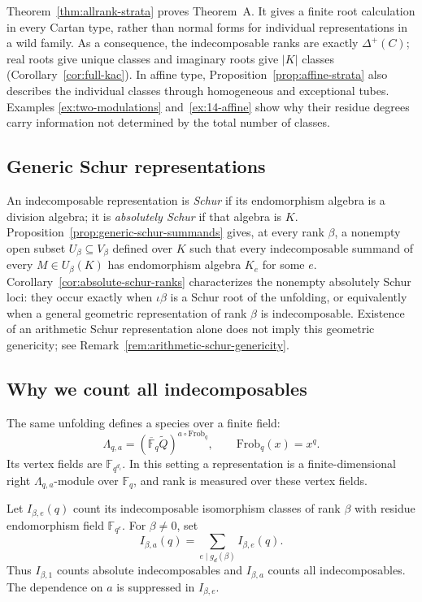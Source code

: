 \documentclass[11pt, reqno]{amsart}
\numberwithin{equation}{section}
\theoremstyle{definition}
\theoremstyle{remark}
\newcommand{\mr}[1]{\mathrm{#1}}
\newcommand{\mb}[1]{\mathbb{#1}}
\newcommand{\Qbar}{\widetilde Q}
\begin{document}
Theorem~\ref{thm:allrank-strata} proves Theorem~A. It gives a finite
root calculation in every Cartan type, rather than normal forms for
individual representations in a wild family. As a consequence, the
indecomposable ranks are exactly $\Delta^+(C)$; real roots give unique
classes and imaginary roots give $|K|$ classes
(Corollary~\ref{cor:full-kac}). In affine type,
Proposition~\ref{prop:affine-strata} also describes the individual
classes through homogeneous and exceptional tubes. Examples
\ref{ex:two-modulations} and~\ref{ex:14-affine} show why their residue
degrees carry information not determined by the total number of classes.


\subsection*{Generic Schur representations}
An indecomposable representation is \emph{Schur} if its endomorphism
algebra is a division algebra; it is \emph{absolutely Schur} if that
algebra is $K$. Proposition~\ref{prop:generic-schur-summands} gives,
at every rank $\beta$, a nonempty open subset $U_\beta\subseteq V_\beta$
defined over $K$ such that every indecomposable summand of every
$M\in U_\beta(K)$ has endomorphism algebra $K_e$ for some $e$.
Corollary~\ref{cor:absolute-schur-ranks} characterizes the nonempty
absolutely Schur loci: they occur exactly when $\iota\beta$ is a
Schur root of the unfolding, or equivalently when a general geometric
representation of rank $\beta$ is indecomposable. Existence of an
arithmetic Schur representation alone does not imply this geometric
genericity; see Remark~\ref{rem:arithmetic-schur-genericity}.


\subsection*{Why we count all indecomposables}
The same unfolding defines a species over a finite field:
\[ \Lambda_{q,a}=(\overline{\mb F}_q\Qbar)^{a\circ\mr{Frob}_q},\qquad \mr{Frob}_q(x)=x^q. \]
Its vertex fields are $\mb F_{q^{d_i}}$. In this setting a
representation is a finite-dimensional right $\Lambda_{q,a}$-module
over $\mb F_q$, and rank is measured over these vertex fields.

Let $I_{\beta,e}(q)$ count its indecomposable isomorphism classes of
rank $\beta$ with residue endomorphism field $\mb F_{q^e}$. For
$\beta\ne0$, set
\[ I_{\beta,a}(q)=\sum_{e\mid g_d(\beta)}I_{\beta,e}(q). \]
Thus $I_{\beta,1}$ counts absolute indecomposables and $I_{\beta,a}$
counts all indecomposables. The dependence on $a$ is suppressed in
$I_{\beta,e}$.
\end{document}
